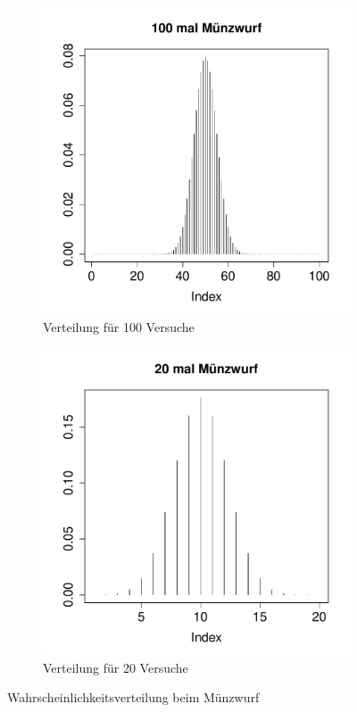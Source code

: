 \begin{figure}[h!]
\centering
\begin{subfigure}[b]{0.48\textwidth}
\includegraphics{verteilungen-025}
\caption{Verteilung für 100 Versuche}
\end{subfigure}
\begin{subfigure}[b]{0.48\textwidth}
\includegraphics{verteilungen-026}
\caption{Verteilung für 20 Versuche}
\end{subfigure}
\caption{Wahrscheinlichkeitsverteilung beim Münzwurf}
\end{figure}

